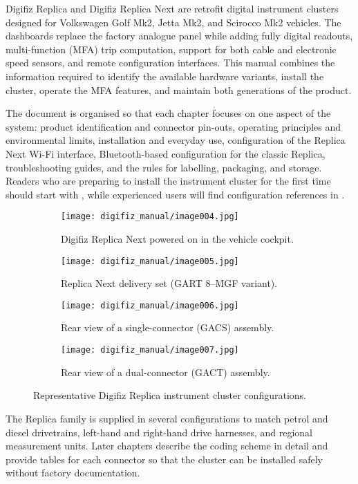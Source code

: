  \label{ch:Introduction}

Digifiz Replica and Digifiz Replica Next are retrofit digital instrument clusters designed for Volkswagen Golf Mk2, Jetta Mk2, and Scirocco Mk2 vehicles.
The dashboards replace the factory analogue panel while adding fully digital readouts, multi-function (MFA) trip computation, support for both cable and electronic speed sensors, and remote configuration interfaces.
This manual combines the information required to identify the available hardware variants, install the cluster, operate the MFA features, and maintain both generations of the product.

The document is organised so that each chapter focuses on one aspect of the system: product identification and connector pin-outs, operating principles and environmental limits, installation and everyday use, configuration of the Replica Next Wi-Fi interface, Bluetooth-based configuration for the classic Replica, troubleshooting guides, and the rules for labelling, packaging, and storage.
Readers who are preparing to install the instrument cluster for the first time should start with , while experienced users will find configuration references in .

\begin{figure}[htbp]
    \centering
    \begin{subfigure}{0.48\textwidth}
        \texttt{[image: digifiz\_manual/image004.jpg]}
        \caption{Digifiz Replica Next powered on in the vehicle cockpit.}
    \end{subfigure}\hfill
    \begin{subfigure}{0.48\textwidth}
        \texttt{[image: digifiz\_manual/image005.jpg]}
        \caption{Replica Next delivery set (GART 8--MGF variant).}
    \end{subfigure}
    \begin{subfigure}{0.48\textwidth}
        \texttt{[image: digifiz\_manual/image006.jpg]}
        \caption{Rear view of a single-connector (GACS) assembly.}
    \end{subfigure}\hfill
    \begin{subfigure}{0.48\textwidth}
        \texttt{[image: digifiz\_manual/image007.jpg]}
        \caption{Rear view of a dual-connector (GACT) assembly.}
    \end{subfigure}
    \caption{Representative Digifiz Replica instrument cluster configurations.}
    \label{fig:intro-product-views}
\end{figure}

The Replica family is supplied in several configurations to match petrol and diesel drivetrains, left-hand and right-hand drive harnesses, and regional measurement units.
Later chapters describe the coding scheme in detail and provide tables for each connector so that the cluster can be installed safely without factory documentation.
